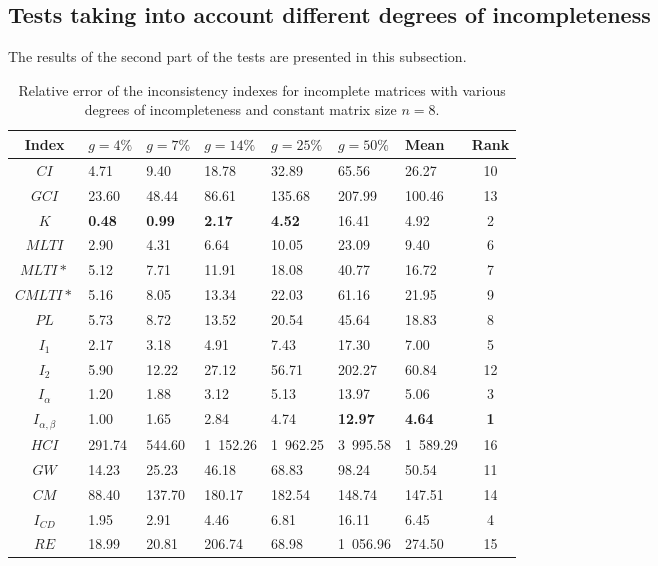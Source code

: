 \subsection{Tests taking into account different degrees of incompleteness}
The results of the second part of the tests are presented in this subsection.
\begin{table}[h]
\begin{center}
\caption{Relative error of the inconsistency indexes for incomplete matrices with various degrees of incompleteness and constant matrix size $n=8$.}
\label{tab:results1}
\begin{tabular}{|c||lllll||l|c|}
\hline Index & $g=4\%$ & $g=7\%$ & $g=14\%$ & $g=25\%$ & $g=50\%$ & Mean & Rank \\ \hline \hline
$CI$ & 4.71 & 9.40 & 18.78 & 32.89 & 65.56 & 26.27 & 10 \\ \hline
$GCI$ & 23.60 & 48.44 & 86.61 & 135.68 & 207.99 & 100.46  & 13 \\ \hline
$K$ & \textbf{0.48} & \textbf{0.99} & \textbf{2.17} & \textbf{4.52} & 16.41 & 4.92 & 2 \\ \hline
$MLTI$ & 2.90 & 4.31 & 6.64 & 10.05 & 23.09 & 9.40 & 6 \\ \hline
$MLTI*$ & 5.12 & 7.71 & 11.91 & 18.08 & 40.77 & 16.72 & 7 \\ \hline
$CMLTI*$ & 5.16 & 8.05 & 13.34 & 22.03 & 61.16 & 21.95 & 9 \\ \hline
$PL$ & 5.73 & 8.72 & 13.52 & 20.54 & 45.64 & 18.83 & 8 \\ \hline
$I_1$ & 2.17 & 3.18 & 4.91 & 7.43 & 17.30 & 7.00 & 5 \\ \hline
$I_2$ & 5.90 & 12.22 & 27.12 & 56.71 & 202.27 & 60.84 & 12 \\ \hline
$I_{\alpha}$ & 1.20 & 1.88 & 3.12 & 5.13 & 13.97 & 5.06 & 3 \\ \hline
$I_{\alpha,\beta}$ & 1.00 & 1.65 & 2.84 & 4.74 & \textbf{12.97} & \textbf{4.64} & \textbf{1} \\ \hline
$HCI$ & 291.74 & 544.60 & 1 152.26 & 1 962.25 & 3 995.58 & 1 589.29 & 16 \\ \hline
$GW$ & 14.23 & 25.23 & 46.18 & 68.83 & 98.24 & 50.54 & 11 \\ \hline
$CM$ & 88.40 & 137.70 & 180.17 & 182.54 & 148.74 & 147.51 & 14 \\ \hline
$I_{CD}$ & 1.95 & 2.91 & 4.46 & 6.81 & 16.11 & 6.45 & 4 \\ \hline
$RE$ & 18.99 & 20.81 & 206.74 & 68.98 & 1 056.96 & 274.50 & 15 \\ \hline
\end{tabular}
\end{center}
\end{table}

